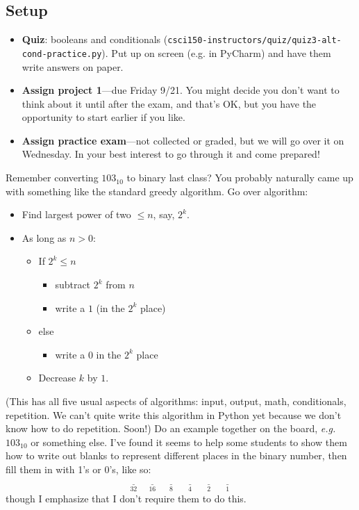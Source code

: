 \documentclass{article}
\newcommand{\eg}{\emph{e.g.}\xspace}
\begin{document}
\subsection*{Setup}
\begin{itemize}
\item \textbf{Quiz}: booleans and conditionals
  (\texttt{csci150-instructors/quiz/quiz3-alt-cond-practice.py}).  Put
  up on screen (e.g. in PyCharm) and have them write answers on paper.
\item \textbf{Assign project 1}---due Friday 9/21.  You might decide
  you don't want to think about it until after the exam, and that's
  OK, but you have the opportunity to start earlier if you like.
\item \textbf{Assign practice exam}---not collected or graded, but we
  will go over it on Wednesday.  In your best interest to go through
  it and come prepared!
\end{itemize}

Remember converting $103_{10}$ to binary last class?  You probably
naturally came up with something like the standard greedy algorithm.
Go over algorithm:

\begin{itemize}
\item Find largest power of two $\leq n$, say, $2^k$.
\item As long as $n > 0$:
  \begin{itemize}
  \item If $2^k \leq n$
    \begin{itemize}
    \item subtract $2^k$ from $n$
    \item write a $1$ (in the $2^k$ place)
    \end{itemize}
  \item else
    \begin{itemize}
    \item  write a $0$ in the $2^k$ place
    \end{itemize}
  \item Decrease $k$ by $1$.
  \end{itemize}
\end{itemize}

(This has all five usual aspects of algorithms: input, output, math,
conditionals, repetition.  We can't quite write this algorithm in
Python yet because we don't know how to do repetition.  Soon!)  Do an
example together on the board, \eg $103_{10}$ or something else. I've
found it seems to help some students to show them how to write out
blanks to represent different places in the binary number, then fill
them in with 1's or 0's, like so:
\[ \underset{32}{\underline{\phantom{XX}}} \; \underset{16}{\underline{\phantom{XX}}} \; \underset{8}{\underline{\phantom{XX}}} \; \underset{4}{\underline{\phantom{XX}}} \; \underset{2}{\underline{\phantom{XX}}} \; \underset{1}{\underline{\phantom{XX}}} \]
though I emphasize that I don't require them to do this.
\end{document}
